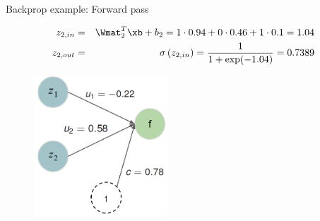 \begin{vbframe}{Backprop example: Forward pass}
  \begin{figure}
    \centering
  \end{figure}
\vspace*{-0.5cm}
  \begin{footnotesize}
    \begin{eqnarray*}
    z_{2,in} &=& \Wmat_2^T \xb + b_2 = 1 \cdot 0.94 + 0 \cdot 0.46 + 1 \cdot 0.1 = 1.04 \\
    z_{2,out} &=& \sigma\left(z_{2,in}\right) = \frac{1}{1+\exp(-1.04)} = \num[round-mode=places,round-precision=4]{0.73885}
    \end{eqnarray*}
  \end{footnotesize}
\framebreak

  \begin{figure}
    \centering
      \includegraphics[width=5cm]{figure/forwardprop4b_new.png}
  \end{figure}


\end{vbframe}
